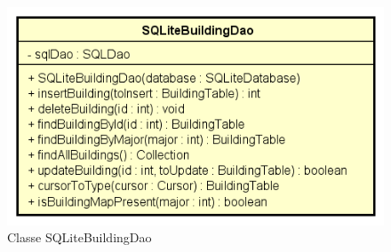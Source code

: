 \documentclass[../DefinizioneDiProdotto.tex]{subfiles}
\begin{document}
    \begin{figure}[H]
        \centering
        \includegraphics{img/SQLiteBuildingDao.png}
        \caption{Classe SQLiteBuildingDao}\label{fig:model::dataaccess::dao::SQLiteBuildingDao} 
    \end{figure}
\end{document}

